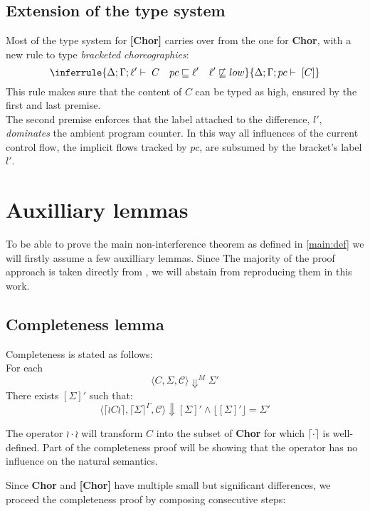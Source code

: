 \documentclass[12pt,a4paper,twoside]{book}
\begin{document}
\subsection{Extension of the type system}
Most of the type system for \textbf{[Chor]} carries over from the one for \textbf{Chor}, with a new rule to type \emph{bracketed choreographies}:
$$
  \inferrule
  {\Delta;\Gamma;\ell' \vdash \; C  \quad pc \sqsubseteq \ell' \quad \ell' \not\sqsubseteq low}
  {\Delta;\Gamma;pc \vdash \; [C]}
$$
This rule makes sure that the content of $C$ can be typed as high, ensured by the first and last premise.\\
The second premise enforces that the label attached to the difference, \(l'\), \emph{dominates} the ambient program counter. In this way all influences of the current control flow, the implicit flows tracked by \(pc\), are subsumed by the bracket’s label \(l'\).

\section{Auxilliary lemmas}
To be able to prove the main non-interference theorem as defined in \ref{main:def} we will firstly assume a few auxilliary lemmas. Since The majority of the proof approach is taken directly from \cite{myers2011proving}, we will abstain from reproducing them in this work.

\subsection{Completeness lemma}\label{chap:compl}
Completeness is stated as follows:\\
For each
$$
\langle C, \Sigma, \mathscr{C} \rangle \Downarrow^M \Sigma'
$$
There exists $[\Sigma]'$ such that:
\begin{equation}
\label{aux:compl}
	\langle \lceil \wr C \wr \rceil, \lceil \Sigma \rceil^\Gamma, \mathscr{C} \rangle \Downarrow [\Sigma]'
\land \lfloor [\Sigma]' \rfloor = \Sigma'
\end{equation}

The operator $\wr \cdot \wr$ will transform $C$ into the subset of \textbf{Chor} for which
$\lceil \cdot \rceil$ is well-defined. Part of the completeness proof will be showing that the operator has no influence on the natural semantics.

Since \textbf{Chor} and \textbf{[Chor]} have multiple small but significant differences, we proceed the completeness proof by composing consecutive steps:
\end{document}
